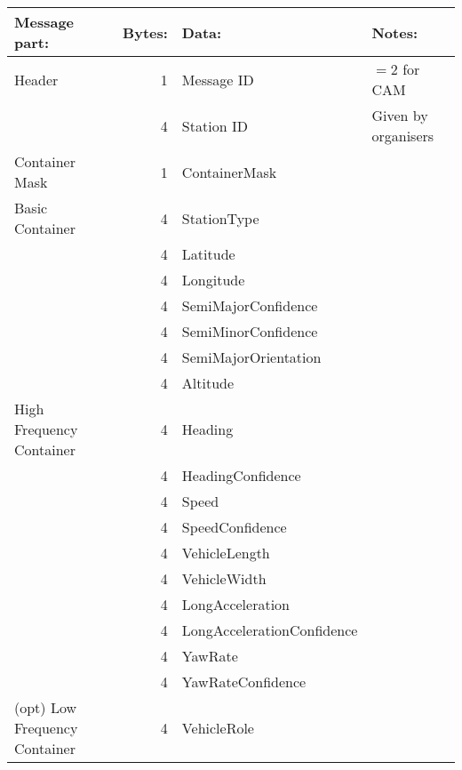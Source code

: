 \documentclass[11pt]{article}
\begin{document}
\begin{center}
\begin{tabular}{lrll}
Message part: & Bytes: & Data: & Notes:\\
\hline
Header & 1 & Message ID & \(=2\) for CAM\\
 & 4 & Station ID & Given by organisers\\
\hline
Container Mask & 1 & ContainerMask & \\
\hline
Basic Container & 4 & StationType & \\
 & 4 & Latitude & \\
 & 4 & Longitude & \\
 & 4 & SemiMajorConfidence & \\
 & 4 & SemiMinorConfidence & \\
 & 4 & SemiMajorOrientation & \\
 & 4 & Altitude & \\
\hline
High Frequency Container & 4 & Heading & \\
 & 4 & HeadingConfidence & \\
 & 4 & Speed & \\
 & 4 & SpeedConfidence & \\
 & 4 & VehicleLength & \\
 & 4 & VehicleWidth & \\
 & 4 & LongAcceleration & \\
 & 4 & LongAccelerationConfidence & \\
 & 4 & YawRate & \\
 & 4 & YawRateConfidence & \\
\hline
(opt) Low Frequency Container & 4 & VehicleRole & \\
\end{tabular}
\end{center}
\end{document}
